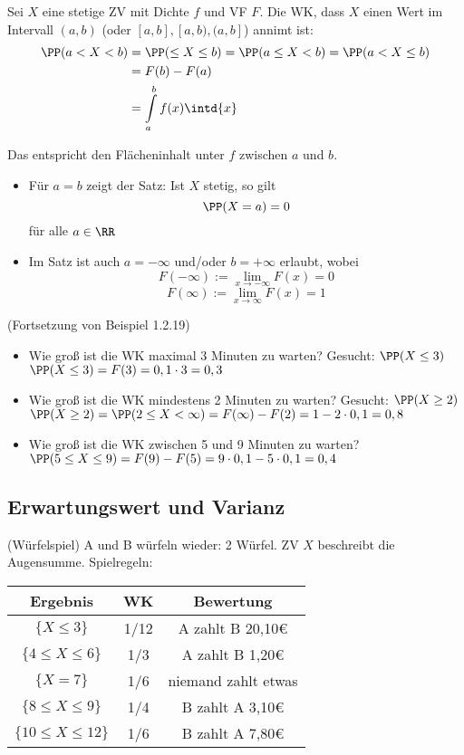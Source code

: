 \documentclass{scrreprt}
\begin{document}
 Sei $X$ eine stetige ZV mit Dichte $f$ und VF $F$. Die WK, dass $X$ einen Wert im Intervall $(a,b)$ (oder $[a,b], [a,b), (a,b]$) annimt ist:
\begin{align*}
\PP(a < X<b) &= \PP(\leq X \leq b)
= \PP(a \leq X <b) 
= \PP(a < X \leq b)\\
&=F(b)-F(a) \\
&= \int\limits_a^b f(x) \intd{x}
\end{align*}

Das entspricht den Flächeninhalt unter $f$ zwischen $a$ und $b$.

\begin{itemize}
\item Für $a=b$ zeigt der Satz: Ist $X$ stetig, so gilt 
$$\PP(X=a) = 0$$
für alle $a \in \RR$
\item Im Satz ist auch $a = - \infty$ und/oder $b=+ \infty$ erlaubt, wobei 
$$F(-\infty) := \lim_{x \to -\infty} F(x) = 0$$
$$F(\infty) := \lim_{x \to \infty} F(x) = 1$$
\end{itemize}

 (Fortsetzung von Beispiel 1.2.19)
\begin{itemize}
\item Wie groß ist die WK maximal 3 Minuten zu warten? Gesucht: $\PP(X \leq 3)$\\
$\PP(X \leq 3) = F(3) = 0,1 \cdot 3 = 0,3$
\item Wie groß ist die WK mindestens 2 Minuten zu warten? Gesucht: $\PP(X \geq 2)$\\
$\PP(X \geq 2 ) = \PP(2 \leq X < \infty) = F(\infty)-F(2) = 1-2\cdot 0,1 = 0,8$
\item Wie groß ist die WK zwischen 5 und 9 Minuten zu warten?\\
$\PP( 5 \leq X \leq 9 ) = F(9) - F(5) = 9 \cdot 0,1 - 5 \cdot 0,1 = 0,4$
\end{itemize}

\subsection{Erwartungswert und Varianz}
 (Würfelspiel) A und B würfeln wieder: 2 Würfel. ZV $X$ beschreibt die Augensumme. Spielregeln:\\
\begin{tabular}{c | c | c}
Ergebnis & WK & Bewertung\\
\hline 
$\{X\leq 3\}$ & 1/12 & A zahlt B 20,10\euro{}\\
$\{4 \leq X \leq 6\}$ & 1/3 & A zahlt B 1,20\euro{}\\
$\{X=7\}$ & 1/6 & niemand zahlt etwas\\
$\{8 \leq X \leq 9\}$ & 1/4 & B zahlt A 3,10\euro{}\\
$\{ 10 \leq X \leq 12\}$ & 1/6 & B zahlt A 7,80\euro{}
\end{tabular}
\end{document}
